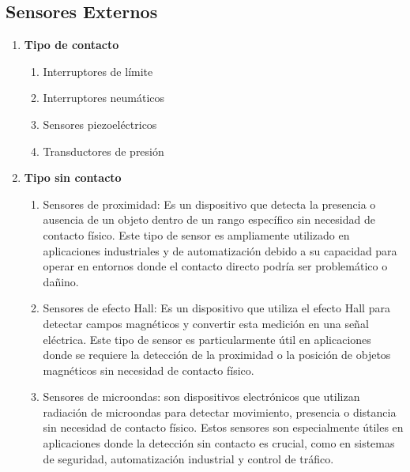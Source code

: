 	\subsection{Sensores Externos}
	 \begin{enumerate}
		\item \textbf{Tipo de contacto}
		\begin{enumerate}
			\item Interruptores de límite
			\item Interruptores neumáticos
			\item Sensores piezoeléctricos
			\item Transductores de presión
		\end{enumerate}
		\item \textbf{Tipo sin contacto}
		\begin{enumerate}
			\item Sensores de proximidad:  Es un dispositivo que detecta la presencia o ausencia de un objeto dentro de un rango específico sin necesidad de contacto físico. Este tipo de sensor es ampliamente utilizado en aplicaciones industriales y de automatización debido a su capacidad para operar en entornos donde el contacto directo podría ser problemático o dañino.\cite{Prox}\\ 
			\begin{figure}[h]
				\centering
				\hfill
			\end{figure}
			\item Sensores de efecto Hall: Es un dispositivo que utiliza el efecto Hall para detectar campos magnéticos y convertir esta medición en una señal eléctrica. Este tipo de sensor es particularmente útil en aplicaciones donde se requiere la detección de la proximidad o la posición de objetos magnéticos sin necesidad de contacto físico.\cite{EHall}\\ 
			\begin{figure}[h]
				\centering
				\hfill
			\end{figure}
			\item Sensores de microondas: son dispositivos electrónicos que utilizan radiación de microondas para detectar movimiento, presencia o distancia sin necesidad de contacto físico. Estos sensores son especialmente útiles en aplicaciones donde la detección sin contacto es crucial, como en sistemas de seguridad, automatización industrial y control de tráfico.\cite{microo}\\ 

\end{enumerate}
\end{enumerate}
